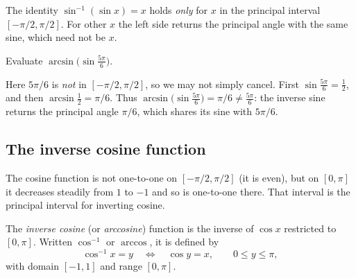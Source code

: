 \begin{caution}
The identity \(\sin^{-1}(\sin x) = x\) holds \emph{only} for \(x\) in the principal interval \([-\pi/2, \pi/2]\). For other \(x\) the left side returns the principal angle with the same sine, which need not be \(x\).
\end{caution}

\begin{workedexample}
\begin{example}\label{ex:arcsin-sin-trap}
Evaluate \(\arcsin\!\bigl(\sin \tfrac{5\pi}{6}\bigr)\).
\end{example}

\begin{solution}
Here \(5\pi/6\) is \emph{not} in \([-\pi/2, \pi/2]\), so we may not simply cancel. First \(\sin \tfrac{5\pi}{6} = \tfrac{1}{2}\), and then \(\arcsin \tfrac{1}{2} = \pi/6\). Thus \(\arcsin\!\bigl(\sin \tfrac{5\pi}{6}\bigr) = \pi/6 \ne \tfrac{5\pi}{6}\): the inverse sine returns the principal angle \(\pi/6\), which shares its sine with \(5\pi/6\).
\end{solution}
\end{workedexample}

\subsection{The inverse cosine function}

The cosine function is not one-to-one on \([-\pi/2, \pi/2]\) (it is even), but on \([0, \pi]\) it decreases steadily from \(1\) to \(-1\) and so is one-to-one there. That interval is the principal interval for inverting cosine.

\begin{definition}\label{def:arccos}
The \emph{inverse cosine} (or \emph{arccosine}) function is the inverse of \(\cos x\) restricted to \([0, \pi]\). Written \(\cos^{-1}\) or \(\arccos\), it is defined by
\[
\cos^{-1} x = y \quad\Longleftrightarrow\quad \cos y = x, \qquad 0 \le y \le \pi,
\]
with domain \([-1, 1]\) and range \([0, \pi]\).
\end{definition}

